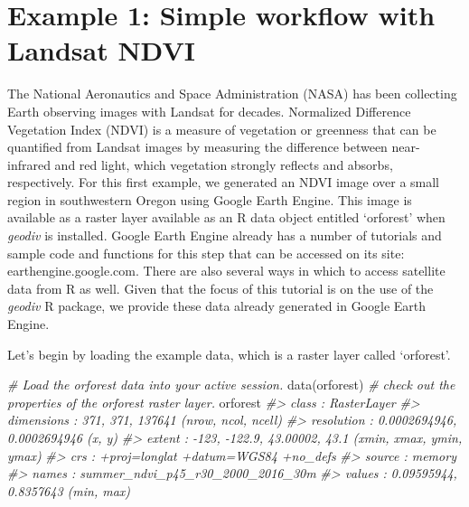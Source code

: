 \documentclass[
]{article}
\newenvironment{Shaded}{\begin{snugshade}}{\end{snugshade}}
\newcommand{\CommentTok}[1]{\textcolor[rgb]{0.56,0.35,0.01}{\textit{#1}}}
\newcommand{\FunctionTok}[1]{\textcolor[rgb]{0.00,0.00,0.00}{#1}}
\newcommand{\NormalTok}[1]{#1}
\begin{document}
\hypertarget{example-1-simple-workflow-with-landsat-ndvi}{%
\section{Example 1: Simple workflow with Landsat
NDVI}\label{example-1-simple-workflow-with-landsat-ndvi}}

The National Aeronautics and Space Administration (NASA) has been
collecting Earth observing images with Landsat for decades. Normalized
Difference Vegetation Index (NDVI) is a measure of vegetation or
greenness that can be quantified from Landsat images by measuring the
difference between near-infrared and red light, which vegetation
strongly reflects and absorbs, respectively. For this first example, we
generated an NDVI image over a small region in southwestern Oregon using
Google Earth Engine. This image is available as a raster layer available
as an R data object entitled `orforest' when \emph{geodiv} is installed.
Google Earth Engine already has a number of tutorials and sample code
and functions for this step that can be accessed on its site:
earthengine.google.com. There are also several ways in which to access
satellite data from R as well. Given that the focus of this tutorial is
on the use of the \emph{geodiv} R package, we provide these data already
generated in Google Earth Engine.

Let's begin by loading the example data, which is a raster layer called
`orforest'.

\begin{Shaded}
\begin{Highlighting}[]
\CommentTok{\# Load the orforest data into your active session.}
\FunctionTok{data}\NormalTok{(orforest)}
\CommentTok{\# check out the properties of the orforest raster layer.}
\NormalTok{orforest}
\CommentTok{\#\textgreater{} class      : RasterLayer }
\CommentTok{\#\textgreater{} dimensions : 371, 371, 137641  (nrow, ncol, ncell)}
\CommentTok{\#\textgreater{} resolution : 0.0002694946, 0.0002694946  (x, y)}
\CommentTok{\#\textgreater{} extent     : {-}123, {-}122.9, 43.00002, 43.1  (xmin, xmax, ymin, ymax)}
\CommentTok{\#\textgreater{} crs        : +proj=longlat +datum=WGS84 +no\_defs }
\CommentTok{\#\textgreater{} source     : memory}
\CommentTok{\#\textgreater{} names      : summer\_ndvi\_p45\_r30\_2000\_2016\_30m }
\CommentTok{\#\textgreater{} values     : 0.09595944, 0.8357643  (min, max)}
\end{Highlighting}
\end{Shaded}
\end{document}
